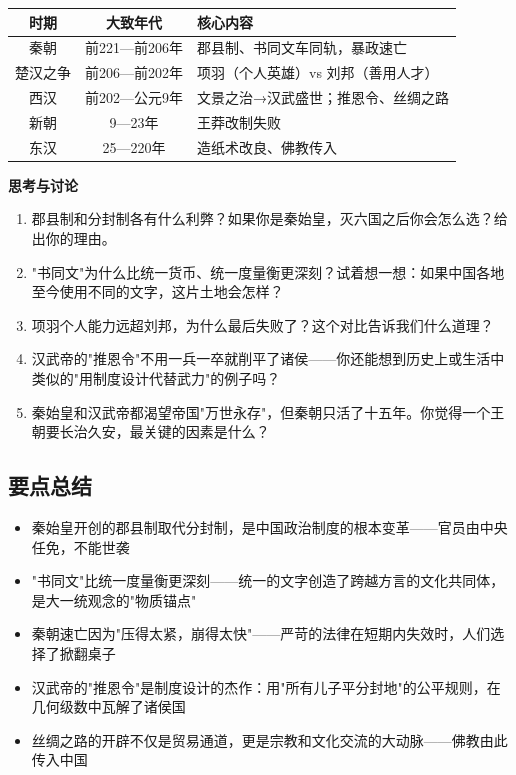 \documentclass[a4paper,12pt]{ctexart}
\begin{document}
\begin{center}
\begin{tabular}{|c|c|p{8cm}|}
\hline
\textbf{时期} & \textbf{大致年代} & \textbf{核心内容} \\
\hline
秦朝 & 前221—前206年 & 郡县制、书同文车同轨，暴政速亡 \\
\hline
楚汉之争 & 前206—前202年 & 项羽（个人英雄）vs 刘邦（善用人才） \\
\hline
西汉 & 前202—公元9年 & 文景之治→汉武盛世；推恩令、丝绸之路 \\
\hline
新朝 & 9—23年 & 王莽改制失败 \\
\hline
东汉 & 25—220年 & 造纸术改良、佛教传入 \\
\hline
\end{tabular}
\end{center}

{\large\textcolor{orange!80!black}{\textbf{思考与讨论}}}
\begin{enumerate}
  \item 郡县制和分封制各有什么利弊？如果你是秦始皇，灭六国之后你会怎么选？给出你的理由。
  \item "书同文"为什么比统一货币、统一度量衡更深刻？试着想一想：如果中国各地至今使用不同的文字，这片土地会怎样？
  \item 项羽个人能力远超刘邦，为什么最后失败了？这个对比告诉我们什么道理？
  \item 汉武帝的"推恩令"不用一兵一卒就削平了诸侯——你还能想到历史上或生活中类似的"用制度设计代替武力"的例子吗？
  \item 秦始皇和汉武帝都渴望帝国"万世永存"，但秦朝只活了十五年。你觉得一个王朝要长治久安，最关键的因素是什么？
\end{enumerate}

\subsection*{要点总结}
\begin{itemize}
  \item 秦始皇开创的郡县制取代分封制，是中国政治制度的根本变革——官员由中央任免，不能世袭
  \item "书同文"比统一度量衡更深刻——统一的文字创造了跨越方言的文化共同体，是大一统观念的"物质锚点"
  \item 秦朝速亡因为"压得太紧，崩得太快"——严苛的法律在短期内失效时，人们选择了掀翻桌子
  \item 汉武帝的"推恩令"是制度设计的杰作：用"所有儿子平分封地"的公平规则，在几何级数中瓦解了诸侯国
  \item 丝绸之路的开辟不仅是贸易通道，更是宗教和文化交流的大动脉——佛教由此传入中国
\end{itemize}
\end{document}
